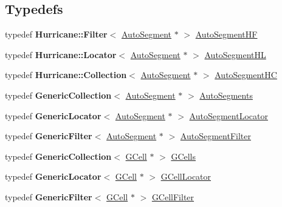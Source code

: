 \subsection*{Typedefs}
\begin{DoxyCompactItemize}
\item 
typedef \textbf{ Hurricane\+::\+Filter}$<$ \hyperlink{classKatabatic_1_1AutoSegment}{Auto\+Segment} $\ast$ $>$ \hyperlink{namespaceKatabatic_a790418bb65a9a13859868df3e8f53598}{Auto\+Segment\+HF}
\item 
typedef \textbf{ Hurricane\+::\+Locator}$<$ \hyperlink{classKatabatic_1_1AutoSegment}{Auto\+Segment} $\ast$ $>$ \hyperlink{namespaceKatabatic_a40ef13471fd0e797b75d3c436813fe65}{Auto\+Segment\+HL}
\item 
typedef \textbf{ Hurricane\+::\+Collection}$<$ \hyperlink{classKatabatic_1_1AutoSegment}{Auto\+Segment} $\ast$ $>$ \hyperlink{namespaceKatabatic_acb3628dc7705fefe38a665cfe43efa6e}{Auto\+Segment\+HC}
\item 
typedef \textbf{ Generic\+Collection}$<$ \hyperlink{classKatabatic_1_1AutoSegment}{Auto\+Segment} $\ast$ $>$ \hyperlink{namespaceKatabatic_a2221b0ddbc24f331809fc86f98e38041}{Auto\+Segments}
\item 
typedef \textbf{ Generic\+Locator}$<$ \hyperlink{classKatabatic_1_1AutoSegment}{Auto\+Segment} $\ast$ $>$ \hyperlink{namespaceKatabatic_ace866cc8e09faf80f71a4087bb8e5870}{Auto\+Segment\+Locator}
\item 
typedef \textbf{ Generic\+Filter}$<$ \hyperlink{classKatabatic_1_1AutoSegment}{Auto\+Segment} $\ast$ $>$ \hyperlink{namespaceKatabatic_a13ffc994c98e1a878e61a927de0509c8}{Auto\+Segment\+Filter}
\item 
typedef \textbf{ Generic\+Collection}$<$ \hyperlink{classKatabatic_1_1GCell}{G\+Cell} $\ast$ $>$ \hyperlink{namespaceKatabatic_ab68f9dfbbc79fd999773beef8561bc31}{G\+Cells}
\item 
typedef \textbf{ Generic\+Locator}$<$ \hyperlink{classKatabatic_1_1GCell}{G\+Cell} $\ast$ $>$ \hyperlink{namespaceKatabatic_ae192ef170a0ad390902e435ac1e6796a}{G\+Cell\+Locator}
\item 
typedef \textbf{ Generic\+Filter}$<$ \hyperlink{classKatabatic_1_1GCell}{G\+Cell} $\ast$ $>$ \hyperlink{namespaceKatabatic_a7d07e23d45818a2ae5f6881ce0ec7403}{G\+Cell\+Filter}
\end{DoxyCompactItemize}
